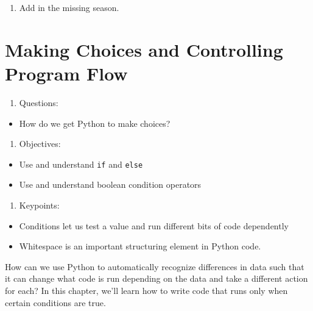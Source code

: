 \documentclass[]{book}
\providecommand{\tightlist}{%
  \setlength{\itemsep}{0pt}\setlength{\parskip}{0pt}}
\theoremstyle{definition}
\theoremstyle{definition}
\theoremstyle{definition}
\theoremstyle{remark}
\begin{document}
\begin{enumerate}
\def\labelenumi{\arabic{enumi}.}
\setcounter{enumi}{3}
\tightlist
\item
  Add in the missing season.
\end{enumerate}

\hypertarget{making-choices-and-controlling-program-flow}{%
\chapter{Making Choices and Controlling Program
Flow}\label{making-choices-and-controlling-program-flow}}

\begin{enumerate}
\def\labelenumi{\arabic{enumi}.}
\tightlist
\item
  Questions:
\end{enumerate}

\begin{itemize}
\tightlist
\item
  How do we get Python to make choices?
\end{itemize}

\begin{enumerate}
\def\labelenumi{\arabic{enumi}.}
\setcounter{enumi}{1}
\tightlist
\item
  Objectives:
\end{enumerate}

\begin{itemize}
\tightlist
\item
  Use and understand \texttt{if} and \texttt{else}
\item
  Use and understand boolean condition operators
\end{itemize}

\begin{enumerate}
\def\labelenumi{\arabic{enumi}.}
\setcounter{enumi}{2}
\tightlist
\item
  Keypoints:
\end{enumerate}

\begin{itemize}
\tightlist
\item
  Conditions let us test a value and run different bits of code
  dependently
\item
  Whitespace is an important structuring element in Python code.
\end{itemize}

How can we use Python to automatically recognize differences in data
such that it can change what code is run depending on the data and take
a different action for each? In this chapter, we'll learn how to write
code that runs only when certain conditions are true.
\end{document}
